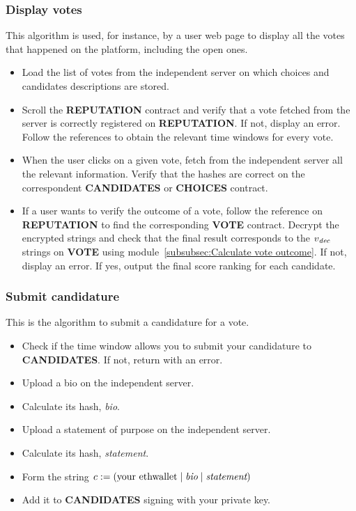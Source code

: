 \documentclass[submission, copyright,creativecommons,sharealike,noncommercial]{eptcs}
\newcommand{\Candidates}{\textbf{CANDIDATES}\xspace}
\newcommand{\Choices}{\textbf{CHOICES}\xspace}
\newcommand{\Vote}{\textbf{VOTE}\xspace}
\newcommand{\Reputation}{\textbf{REPUTATION}\xspace}
\begin{document}
\subsubsection{Display votes}\label{subsubsec:Display votes}
	This algorithm is used, for instance, by a user web page to display all the votes that happened on the platform, including the open ones.
	\begin{itemize}
		\item Load the list of votes from the independent server on which choices and candidates descriptions are stored.
		\item Scroll the \Reputation contract and verify that a vote fetched from the server is correctly registered on \Reputation. If not, display an error. Follow the references to obtain the relevant time windows for every vote.
		
		\item When the user clicks on a given vote, fetch from the independent server all the relevant information. Verify that the hashes are correct on the correspondent \Candidates or \Choices contract.
		
		\item If a user wants to verify the outcome of a vote, follow the reference on \Reputation to find the corresponding \Vote contract. Decrypt the encrypted strings and check that the final result corresponds to the $v_{\emph{dec}}$ strings on \Vote using module~\ref{subsubsec:Calculate vote outcome}. If not, display an error. If yes, output the final score ranking for each candidate.
	\end{itemize}

\subsubsection{Submit candidature}\label{subsubsec:submit candidature}
	This is the algorithm to submit a candidature for a vote.
	\begin{itemize}
		\item Check if the time window allows you to submit your candidature to \Candidates. If not, return with an error.
		\item Upload a bio on the independent server.
		\item Calculate its hash, \emph{bio}.
		\item Upload a statement of purpose on the independent server.
		\item Calculate its hash, \emph{statement}.
		\item Form the string $c:= (\text{your ethwallet} \mid \emph{bio} \mid \emph{statement})$
		\item Add it to \Candidates signing with your private key.	
	\end{itemize}
\end{document}
